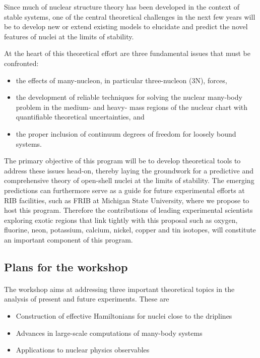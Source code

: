 \documentclass[%
twoside,                 %
final,                   %
10pt]{article}
\begin{document}
Since much of nuclear structure theory has been developed in the
context of stable systems, one of the central theoretical challenges
in the next few years will be to develop new or extend existing models
to elucidate and predict the novel features of nuclei at the limits of
stability.  

At the heart of this theoretical effort are three fundamental issues that must be confronted:
\begin{itemize}
\item the effects of many-nucleon, in particular three-nucleon (3N), forces, 

\item the development of reliable techniques for solving the nuclear many-body problem in the medium- and heavy- mass regions of the nuclear chart with quantifiable theoretical uncertainties, and 

\item the proper inclusion of continuum degrees of freedom for loosely bound systems. 
\end{itemize}

\noindent
The primary objective of this program will be to develop theoretical tools to  address these issues head-on, thereby laying the groundwork for a predictive and comprehensive theory of open-shell nuclei at the limits of stability.  The emerging predictions can furthermore serve as a guide for future experimental efforts at RIB facilities, such as FRIB at Michigan State University, where we propose to host this program.  Therefore the contributions of leading experimental scientists exploring exotic regions that link tightly with this proposal such as oxygen, fluorine, neon, potassium, calcium, nickel, copper and tin isotopes, will constitute an important component of this program.





\subsection*{Plans for the workshop}

\paragraph{}
The workshop aims at addressing three important theoretical topics in the analysis
of present and future experiments.  These are
\begin{itemize}
\item Construction of effective Hamiltonians for nuclei close to the driplines

\item Advances in large-scale computations of many-body systems

\item Applications to nuclear physics observables
\end{itemize}
\end{document}
